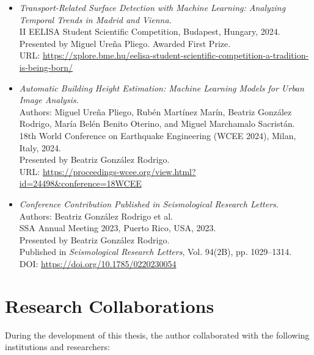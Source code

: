 \begin{itemize}
    \item \emph{Transport-Related Surface Detection with Machine Learning: Analyzing Temporal Trends in Madrid and Vienna}.\\
    II EELISA Student Scientific Competition, Budapest, Hungary, 2024.\\
    Presented by Miguel Ureña Pliego. Awarded First Prize.\\
    URL: \url{https://xplore.bme.hu/eelisa-student-scientific-competition-a-tradition-is-being-born/}
    
    \item \emph{Automatic Building Height Estimation: Machine Learning Models for Urban Image Analysis}.\\
    Authors: Miguel Ureña Pliego, Rubén Martínez Marín, Beatriz González Rodrigo, María Belén Benito Oterino, and Miguel Marchamalo Sacristán.\\
    18th World Conference on Earthquake Engineering (WCEE 2024), Milan, Italy, 2024.\\
    Presented by Beatriz González Rodrigo.\\
    URL: \url{https://proceedings-wcee.org/view.html?id=24498&conference=18WCEE}
    
    \item \emph{Conference Contribution Published in Seismological Research Letters}.\\
    Authors: Beatriz González Rodrigo et al.\\
    SSA Annual Meeting 2023, Puerto Rico, USA, 2023.\\
    Presented by Beatriz González Rodrigo.\\
    Published in \textit{Seismological Research Letters}, Vol. 94(2B), pp. 1029--1314.\\
    DOI: \url{https://doi.org/10.1785/0220230054}
    

\end{itemize}

\section*{Research Collaborations}

During the development of this thesis, the author collaborated with the following institutions and researchers:

